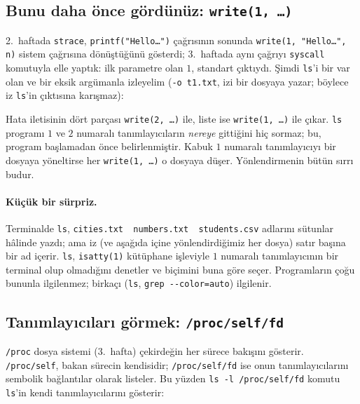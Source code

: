 \documentclass[11pt,a4paper]{article}
\newcommand{\cmd}[1]{\texttt{#1}}
\begin{document}
\subsection{Bunu daha önce gördünüz: \texttt{write(1, \dots)}}

2.~haftada \cmd{strace}, \cmd{printf("Hello\dots")} çağrısının sonunda \cmd{write(1, "Hello\dots", n)} sistem çağrısına dönüştüğünü gösterdi; 3.~haftada aynı çağrıyı \texttt{syscall} komutuyla elle yaptık: ilk parametre olan $1$, standart çıktıydı. Şimdi \cmd{ls}'i bir var olan ve bir eksik argümanla izleyelim (\cmd{-o t1.txt}, izi bir dosyaya yazar; böylece iz \cmd{ls}'in çıktısına karışmaz):



Hata iletisinin dört parçası \cmd{write(2, \dots)} ile, liste ise \cmd{write(1, \dots)} ile çıkar. \cmd{ls} programı $1$ ve $2$ numaralı tanımlayıcıların \emph{nereye} gittiğini hiç sormaz; bu, program başlamadan önce belirlenmiştir. Kabuk $1$ numaralı tanımlayıcıyı bir dosyaya yöneltirse her \cmd{write(1, \dots)} o dosyaya düşer. Yönlendirmenin bütün sırrı budur.

\paragraph{Küçük bir sürpriz.} Terminalde \cmd{ls}, \texttt{cities.txt\ \ numbers.txt\ \ students.csv} adlarını sütunlar hâlinde yazdı; ama iz (ve aşağıda içine yönlendirdiğimiz her dosya) satır başına bir ad içerir. \cmd{ls}, \cmd{isatty(1)} kütüphane işleviyle $1$ numaralı tanımlayıcının bir terminal olup olmadığını denetler ve biçimini buna göre seçer. Programların çoğu bununla ilgilenmez; birkaçı (\cmd{ls}, \cmd{grep -{}-color=auto}) ilgilenir.

\subsection{Tanımlayıcıları görmek: \texttt{/proc/self/fd}}

\texttt{/proc} dosya sistemi (3.~hafta) çekirdeğin her sürece bakışını gösterir. \texttt{/proc/self}, bakan sürecin kendisidir; \texttt{/proc/self/fd} ise onun tanımlayıcılarını sembolik bağlantılar olarak listeler. Bu yüzden \cmd{ls -l /proc/self/fd} komutu \cmd{ls}'in kendi tanımlayıcılarını gösterir:


\end{document}
